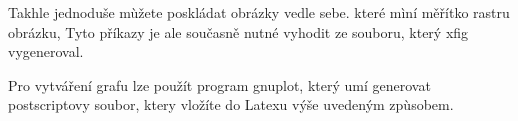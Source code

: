 \documentclass[12pt]{article}
\begin{document}
Takhle jednoduše mùžete poskládat obrázky vedle sebe.
které mìní měřítko rastru obrázku, Tyto příkazy je ale současně
nutné vyhodit ze souboru, který xfig vygeneroval.

Pro vytváření grafu lze použít program gnuplot, který umí generovat
postscriptovy soubor, ktery vložíte do Latexu výše uvedeným
zpùsobem.
\end{document}
